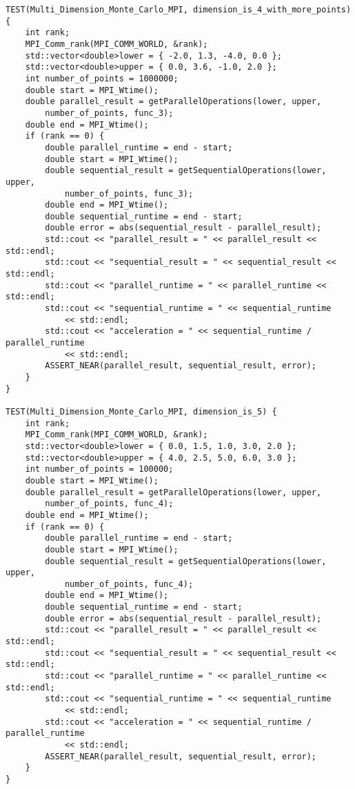 \documentclass{report}
\begin{document}
\begin{lstlisting}
TEST(Multi_Dimension_Monte_Carlo_MPI, dimension_is_4_with_more_points) {
    int rank;
    MPI_Comm_rank(MPI_COMM_WORLD, &rank);
    std::vector<double>lower = { -2.0, 1.3, -4.0, 0.0 };
    std::vector<double>upper = { 0.0, 3.6, -1.0, 2.0 };
    int number_of_points = 1000000;
    double start = MPI_Wtime();
    double parallel_result = getParallelOperations(lower, upper,
        number_of_points, func_3);
    double end = MPI_Wtime();
    if (rank == 0) {
        double parallel_runtime = end - start;
        double start = MPI_Wtime();
        double sequential_result = getSequentialOperations(lower, upper,
            number_of_points, func_3);
        double end = MPI_Wtime();
        double sequential_runtime = end - start;
        double error = abs(sequential_result - parallel_result);
        std::cout << "parallel_result = " << parallel_result << std::endl;
        std::cout << "sequential_result = " << sequential_result << std::endl;
        std::cout << "parallel_runtime = " << parallel_runtime << std::endl;
        std::cout << "sequential_runtime = " << sequential_runtime
            << std::endl;
        std::cout << "acceleration = " << sequential_runtime / parallel_runtime
            << std::endl;
        ASSERT_NEAR(parallel_result, sequential_result, error);
    }
}

TEST(Multi_Dimension_Monte_Carlo_MPI, dimension_is_5) {
    int rank;
    MPI_Comm_rank(MPI_COMM_WORLD, &rank);
    std::vector<double>lower = { 0.0, 1.5, 1.0, 3.0, 2.0 };
    std::vector<double>upper = { 4.0, 2.5, 5.0, 6.0, 3.0 };
    int number_of_points = 100000;
    double start = MPI_Wtime();
    double parallel_result = getParallelOperations(lower, upper,
        number_of_points, func_4);
    double end = MPI_Wtime();
    if (rank == 0) {
        double parallel_runtime = end - start;
        double start = MPI_Wtime();
        double sequential_result = getSequentialOperations(lower, upper,
            number_of_points, func_4);
        double end = MPI_Wtime();
        double sequential_runtime = end - start;
        double error = abs(sequential_result - parallel_result);
        std::cout << "parallel_result = " << parallel_result << std::endl;
        std::cout << "sequential_result = " << sequential_result << std::endl;
        std::cout << "parallel_runtime = " << parallel_runtime << std::endl;
        std::cout << "sequential_runtime = " << sequential_runtime
            << std::endl;
        std::cout << "acceleration = " << sequential_runtime / parallel_runtime
            << std::endl;
        ASSERT_NEAR(parallel_result, sequential_result, error);
    }
}


\end{lstlisting}
\end{document}
